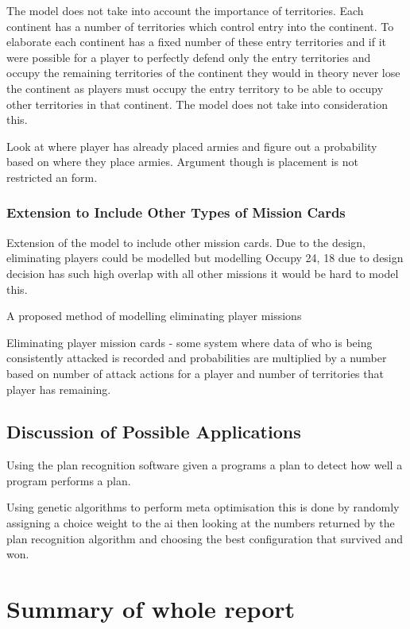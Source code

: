 \documentclass[parskip]{cs4rep}
\begin{document}
The model does not take into account the importance of territories. Each continent has a number of territories which control entry into the continent. To elaborate each continent has a fixed number of these entry territories and if it were possible for a player to perfectly defend only the entry territories and occupy the remaining territories of the continent they would in theory never lose the continent as players must occupy the entry territory to be able to occupy other territories in that continent. The model does not take into consideration this.

Look at where player has already placed armies and figure out a probability based on where they place armies. Argument though is placement is not restricted an form.

\subsubsection{Extension to Include Other Types of Mission Cards}

Extension of the model to include other mission cards. Due to the design, eliminating players could be modelled but modelling Occupy 24, 18 due to design decision has such high overlap with all other missions it would be hard to model this.

A proposed method of modelling eliminating player missions

Eliminating player mission cards - some system where data of who is being consistently attacked is recorded and probabilities are multiplied by a number based on number of attack actions for a player and number of territories that player has remaining.

\subsection{Discussion of Possible Applications}

Using the plan recognition software given a programs a plan to detect how well a program performs a plan. 

Using genetic algorithms to perform meta optimisation this is done by randomly assigning a choice weight to the ai then looking at the numbers returned by the plan recognition algorithm and choosing the best configuration that survived and won.

\section{Summary of whole report}
\end{document}
